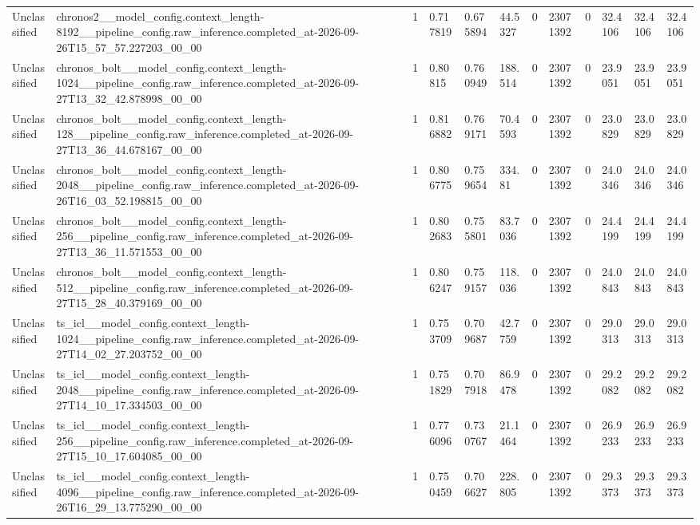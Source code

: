 \begin{tabular}{llllllllllll}
Unclassified & chronos2\_\_model\_config.context\_length-8192\_\_pipeline\_config.raw\_inference.completed\_at-2026-09-26T15\_57\_57.227203\_00\_00 & 1 & 0.717819 & 0.675894 & 44.5327 & 0 & 23071392 & 0 & 32.4106 & 32.4106 & 32.4106 \\
Unclassified & chronos\_bolt\_\_model\_config.context\_length-1024\_\_pipeline\_config.raw\_inference.completed\_at-2026-09-27T13\_32\_42.878998\_00\_00 & 1 & 0.80815 & 0.760949 & 188.514 & 0 & 23071392 & 0 & 23.9051 & 23.9051 & 23.9051 \\
Unclassified & chronos\_bolt\_\_model\_config.context\_length-128\_\_pipeline\_config.raw\_inference.completed\_at-2026-09-27T13\_36\_44.678167\_00\_00 & 1 & 0.816882 & 0.769171 & 70.4593 & 0 & 23071392 & 0 & 23.0829 & 23.0829 & 23.0829 \\
Unclassified & chronos\_bolt\_\_model\_config.context\_length-2048\_\_pipeline\_config.raw\_inference.completed\_at-2026-09-26T16\_03\_52.198815\_00\_00 & 1 & 0.806775 & 0.759654 & 334.81 & 0 & 23071392 & 0 & 24.0346 & 24.0346 & 24.0346 \\
Unclassified & chronos\_bolt\_\_model\_config.context\_length-256\_\_pipeline\_config.raw\_inference.completed\_at-2026-09-27T13\_36\_11.571553\_00\_00 & 1 & 0.802683 & 0.755801 & 83.7036 & 0 & 23071392 & 0 & 24.4199 & 24.4199 & 24.4199 \\
Unclassified & chronos\_bolt\_\_model\_config.context\_length-512\_\_pipeline\_config.raw\_inference.completed\_at-2026-09-27T15\_28\_40.379169\_00\_00 & 1 & 0.806247 & 0.759157 & 118.036 & 0 & 23071392 & 0 & 24.0843 & 24.0843 & 24.0843 \\
Unclassified & ts\_icl\_\_model\_config.context\_length-1024\_\_pipeline\_config.raw\_inference.completed\_at-2026-09-27T14\_02\_27.203752\_00\_00 & 1 & 0.753709 & 0.709687 & 42.7759 & 0 & 23071392 & 0 & 29.0313 & 29.0313 & 29.0313 \\
Unclassified & ts\_icl\_\_model\_config.context\_length-2048\_\_pipeline\_config.raw\_inference.completed\_at-2026-09-27T14\_10\_17.334503\_00\_00 & 1 & 0.751829 & 0.707918 & 86.9478 & 0 & 23071392 & 0 & 29.2082 & 29.2082 & 29.2082 \\
Unclassified & ts\_icl\_\_model\_config.context\_length-256\_\_pipeline\_config.raw\_inference.completed\_at-2026-09-27T15\_10\_17.604085\_00\_00 & 1 & 0.776096 & 0.730767 & 21.1464 & 0 & 23071392 & 0 & 26.9233 & 26.9233 & 26.9233 \\
Unclassified & ts\_icl\_\_model\_config.context\_length-4096\_\_pipeline\_config.raw\_inference.completed\_at-2026-09-26T16\_29\_13.775290\_00\_00 & 1 & 0.750459 & 0.706627 & 228.805 & 0 & 23071392 & 0 & 29.3373 & 29.3373 & 29.3373 \\

\end{tabular}
